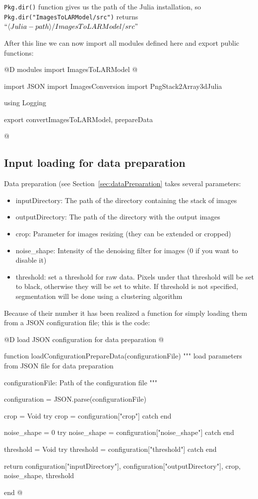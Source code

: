 \documentclass[11pt,oneside]{article}	%
\begin{document}
\texttt{Pkg.dir()} function gives us the path of the Julia installation, so \texttt{Pkg.dir("ImagesToLARModel/src")} returns $``\langle Julia-path\rangle /ImagesToLARModel/src"$

After this line we can now import all modules defined here and export public functions:

@D modules import ImagesToLARModel
@{import JSON
import ImagesConversion
import PngStack2Array3dJulia

using Logging

export convertImagesToLARModel, prepareData

@}

\subsection{Input loading for data preparation}\label{sec:inputDataPreparation}

Data preparation (see Section~\ref{sec:dataPreparation} takes several parameters:

\begin{itemize}
 \item inputDirectory: The path of the directory containing the stack of images
 \item outputDirectory: The path of the directory with the output images
 \item crop: Parameter for images resizing (they can be extended or cropped)
 \item noise\_shape: Intensity of the denoising filter for images (0 if you want to disable it)
 \item threshold: set a threshold for raw data. Pixels under that threshold will be set to black, otherwise they will be set to white. If threshold is not specified, segmentation will be done using a clustering algorithm
\end{itemize}

Because of their number it has been realized a function for simply loading them from a JSON configuration file; this is the code:

@D load JSON configuration for data preparation
@{function loadConfigurationPrepareData(configurationFile)
  """
  load parameters from JSON file for data preparation

  configurationFile: Path of the configuration file
  """

  configuration = JSON.parse(configurationFile)


  crop = Void
  try
    crop = configuration["crop"]
  catch
  end
  
  noise_shape = 0
  try
    noise_shape = configuration["noise_shape"]
  catch
  end
  
  threshold = Void
  try
    threshold = configuration["threshold"]
  catch
  end
  
  return configuration["inputDirectory"], configuration["outputDirectory"],
        crop, noise_shape, threshold

end
@}
\end{document}
